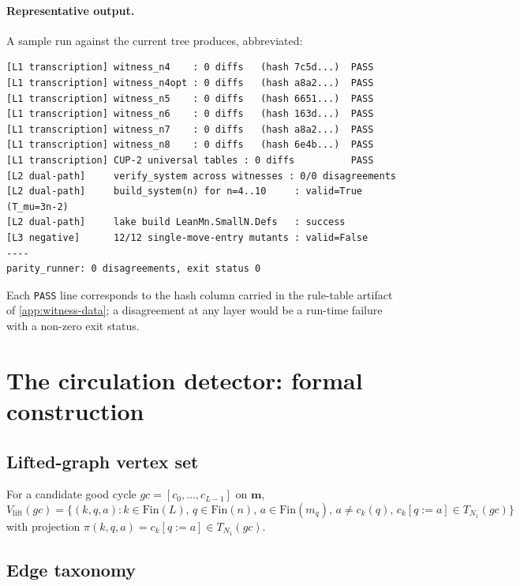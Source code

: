 \documentclass[11pt,a4paper]{article}
\theoremstyle{plain}
\theoremstyle{definition}
\begin{document}
\paragraph{Representative output.}  A sample run against the
current tree produces, abbreviated:
\begin{verbatim}
[L1 transcription] witness_n4    : 0 diffs   (hash 7c5d...)  PASS
[L1 transcription] witness_n4opt : 0 diffs   (hash a8a2...)  PASS
[L1 transcription] witness_n5    : 0 diffs   (hash 6651...)  PASS
[L1 transcription] witness_n6    : 0 diffs   (hash 163d...)  PASS
[L1 transcription] witness_n7    : 0 diffs   (hash a8a2...)  PASS
[L1 transcription] witness_n8    : 0 diffs   (hash 6e4b...)  PASS
[L1 transcription] CUP-2 universal tables : 0 diffs          PASS
[L2 dual-path]     verify_system across witnesses : 0/0 disagreements
[L2 dual-path]     build_system(n) for n=4..10     : valid=True (T_mu=3n-2)
[L2 dual-path]     lake build LeanMn.SmallN.Defs   : success
[L3 negative]      12/12 single-move-entry mutants : valid=False
----
parity_runner: 0 disagreements, exit status 0
\end{verbatim}
Each \texttt{PASS} line corresponds to the hash column carried in
the rule-table artifact of \cref{app:witness-data}; a
disagreement at any layer would be a run-time failure with a
non-zero exit status.

\section{The circulation detector: formal construction}\label{app:detector}

\subsection{Lifted-graph vertex set}\label{app:detector-vertex}

For a candidate good cycle $gc = [c_0, \ldots, c_{L-1}]$ on
$\mathbf{m}$,
\[
   V_{\mathrm{lift}}(gc) = \bigl\{ (k, q, a) : k \in \mathrm{Fin}(L),\,
     q \in \mathrm{Fin}(n),\, a \in \mathrm{Fin}(m_q),\,
     a \ne c_k(q),\, c_k[q := a] \in T_{N_1}(gc) \bigr\}
\]
with projection $\pi(k, q, a) = c_k[q := a] \in T_{N_1}(gc)$.

\subsection{Edge taxonomy}\label{app:detector-edges}
\end{document}
